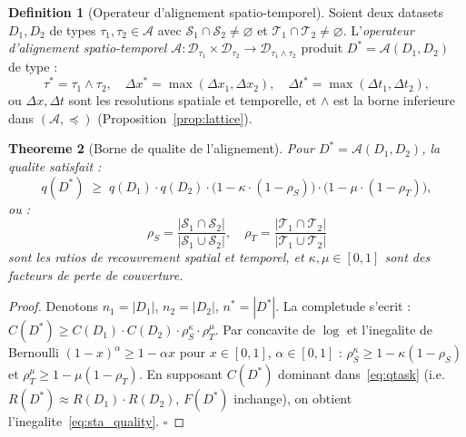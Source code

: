 \documentclass[12pt,a4paper]{article}
\theoremstyle{plain}
\newtheorem{theorem}{Theoreme}[section]
\theoremstyle{definition}
\newtheorem{definition}[theorem]{Definition}
\theoremstyle{remark}
\begin{document}
	\begin{definition}[Operateur d'alignement spatio-temporel]
		\label{def:sta}
		Soient deux datasets $D_1, D_2$ de types $\tau_1, \tau_2 \in \mathcal{A}$
		avec $\mathcal{S}_1 \cap \mathcal{S}_2 \neq \varnothing$ et
		$\mathcal{T}_1 \cap \mathcal{T}_2 \neq \varnothing$.
		L'\emph{operateur d'alignement spatio-temporel}
		$\mathcal{A} : \mathcal{D}_{\tau_1} \times \mathcal{D}_{\tau_2}
		\to \mathcal{D}_{\tau_1 \wedge \tau_2}$
		produit $D^* = \mathcal{A}(D_1, D_2)$ de type :
		\begin{equation}
			\tau^* = \tau_1 \wedge \tau_2,\quad
			\Delta x^* = \max(\Delta x_1, \Delta x_2),\quad
			\Delta t^* = \max(\Delta t_1, \Delta t_2),
			\label{eq:sta}
		\end{equation}
		ou $\Delta x, \Delta t$ sont les resolutions spatiale et temporelle,
		et $\wedge$ est la borne inferieure dans $(\mathcal{A},\preceq)$
		(Proposition~\ref{prop:lattice}).
	\end{definition}
	
	\begin{theorem}[Borne de qualite de l'alignement]
		\label{thm:sta_quality}
		Pour $D^* = \mathcal{A}(D_1, D_2)$, la qualite satisfait :
		\begin{equation}
			q(D^*) \;\geq\;
			q(D_1) \cdot q(D_2) \cdot
			\bigl(1 - \kappa \cdot (1-\rho_S)\bigr)
			\cdot \bigl(1 - \mu \cdot (1-\rho_T)\bigr),
			\label{eq:sta_quality}
		\end{equation}
		ou :
		\[
		\rho_S = \frac{|\mathcal{S}_1 \cap \mathcal{S}_2|}{|\mathcal{S}_1\cup\mathcal{S}_2|},
		\quad
		\rho_T = \frac{|\mathcal{T}_1 \cap \mathcal{T}_2|}{|\mathcal{T}_1\cup\mathcal{T}_2|}
		\]
		sont les ratios de recouvrement spatial et temporel, et
		$\kappa, \mu \in [0,1]$ sont des facteurs de perte de couverture.
	\end{theorem}
	
	\begin{proof}
		Denotons $n_1 = |D_1|$, $n_2 = |D_2|$, $n^* = |D^*|$.
		La completude s'ecrit :
		$C(D^*) \geq C(D_1)\cdot C(D_2) \cdot \rho_S^{\kappa} \cdot \rho_T^{\mu}$.
		Par concavite de $\log$ et l'inegalite de Bernoulli
		$(1-x)^\alpha \geq 1-\alpha x$ pour $x \in [0,1]$, $\alpha \in [0,1]$ :
		$\rho_S^{\kappa} \geq 1-\kappa(1-\rho_S)$
		et $\rho_T^{\mu} \geq 1-\mu(1-\rho_T)$.
		En supposant $C(D^*)$ dominant dans~\eqref{eq:qtask}
		(i.e. $R(D^*) \approx R(D_1)\cdot R(D_2)$, $F(D^*)$ inchange),
		on obtient l'inegalite~\eqref{eq:sta_quality}. \hfill$\square$
	\end{proof}
	
\end{document}
